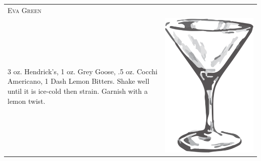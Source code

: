 \documentclass{article}
\begin{document}
\begin{multicols}{2}
\begin{tabular}{p{2in} p{0.5in}}
\multicolumn{2}{p{3in}}{\centering\Huge\textsc{Eva Green}}\\ 
  \vspace{-0.1in}3 oz. Hendrick's, 1 oz. Grey Goose, .5 oz. Cocchi Americano, 1 Dash Lemon Bitters. Shake well until it is ice-cold then strain. Garnish with a lemon twist. &
  \vspace{-0.1in} \includegraphics{goblet.png}
\end{tabular}


\end{multicols}
\end{document}
